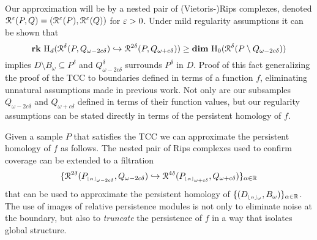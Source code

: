 Our approximation will be by a nested pair of (Vietoris-)Rips complexes, denoted $\mathcal{R}^\varepsilon(P, Q) = (\mathcal{R}^\varepsilon(P), \mathcal{R}^\varepsilon(Q))$ for $\varepsilon > 0$.
Under mild regularity assumptions it can be shown that
\[ \mathbf{rk}~\mathrm{H}_d(\mathcal{R}^\delta(P, Q_{\omega - 2c\delta})\hookrightarrow \mathcal{R}^{2\delta}(P, Q_{\omega+c\delta}))\geq \mathbf{dim}~\mathrm{H}_0(\mathcal{R}^\delta(P\setminus Q_{\omega-2c\delta}))\]
implies $D\setminus B_\omega\subseteq P^\delta$ and $Q_{\omega-2c\delta}^\delta$ surrounds $P^\delta$ in $D$.
Proof of this fact generalizing the proof of the TCC to boundaries defined in terms of a function $f$, eliminating unnatural assumptions made in previous work.
Not only are our subsamples $Q_{\omega-2c\delta}$ and $Q_{\omega+c\delta}$ defined in terms of their function values, but our regularity assumptions can be stated directly in terms of the persistent homology of $f$.

Given a sample $P$ that satisfies the TCC we can approximate the persistent homology of $f$ as follows.
The nested pair of Rips complexes used to confirm coverage can be extended to a filtration
\[ \{\mathcal{R}^{2\delta}(P_{\scriptscriptstyle \lfloor\alpha\rfloor_{\omega-2c\delta}}, Q_{\omega-2c\delta})\hookrightarrow \mathcal{R}^{4\delta}(P_{\scriptscriptstyle \lfloor\alpha\rfloor_{\omega+c\delta}}, Q_{\omega+c\delta})\}_{\alpha\in\mathbb{R}}\]
that can be used to approximate the persistent homology of $\{(D_{\scriptscriptstyle \lfloor\alpha\rfloor_{\omega}}, B_\omega)\}_{\alpha\in\mathbb{R}}$.
%
%
%
The use of images of relative persistence modules is not only to eliminate noise at the boundary, but also to \emph{truncate} the persistence of $f$ in a way that isolates global structure.

